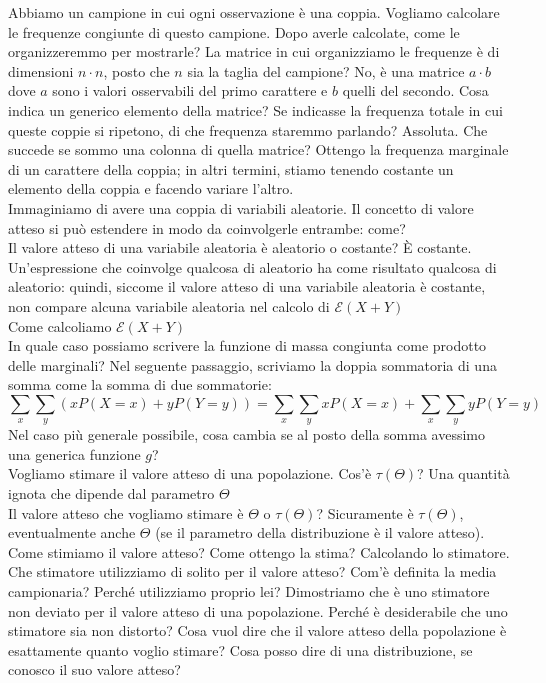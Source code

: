 \documentclass{article}
\begin{document}
    Abbiamo un campione in cui ogni osservazione è una coppia. Vogliamo calcolare le frequenze congiunte di questo campione. Dopo averle calcolate, come le organizzeremmo per
    mostrarle? La matrice in cui organizziamo le frequenze è di dimensioni $ n \cdot n $, posto che $ n $ sia la taglia del campione? No, è una matrice $ a \cdot b $ dove $ a $ sono i
    valori osservabili del primo carattere e $ b $ quelli del secondo. Cosa indica un generico elemento della matrice? Se indicasse la frequenza totale in cui queste coppie si ripetono,
    di che frequenza staremmo parlando? Assoluta. Che succede se sommo una colonna di quella matrice? Ottengo la frequenza marginale di un carattere della coppia; in altri 
    termini, stiamo tenendo costante un elemento della coppia e facendo variare l'altro. \\
    Immaginiamo di avere una coppia di variabili aleatorie. Il concetto di valore atteso si può estendere in modo da coinvolgerle entrambe: come? \\
    Il valore atteso di una variabile aleatoria è aleatorio o costante? È costante. Un'espressione che coinvolge qualcosa di aleatorio ha come risultato qualcosa di aleatorio:
    quindi, siccome il valore atteso di una variabile aleatoria è costante, non compare alcuna variabile aleatoria nel calcolo di $ \mathcal E ( X + Y ) $ \\
    Come calcoliamo $ \mathcal E ( X + Y ) $ \\
    In quale caso possiamo scrivere la funzione di massa congiunta come prodotto delle marginali?
    Nel seguente passaggio, scriviamo la doppia sommatoria di una somma come la somma di due sommatorie:
    \[
        \sum_{ x } \sum_{ y } ( x P ( X = x ) + y P ( Y = y )) = \sum_{ x } \sum_{ y } x P ( X = x ) + \sum_{ x } \sum_{ y } y P ( Y = y )
    \]
    Nel caso più generale possibile, cosa cambia se al posto della somma avessimo una generica funzione $ g $? \\
    Vogliamo stimare il valore atteso di una popolazione. Cos'è $ \tau (\Theta) $? Una quantità ignota che dipende dal parametro $ \Theta $ \\
    Il valore atteso che vogliamo stimare è $ \Theta $ o $ \tau (\Theta) $? Sicuramente è $ \tau (\Theta) $, eventualmente anche $ \Theta $ (se il parametro della distribuzione è
    il valore atteso). Come stimiamo il valore atteso? Come ottengo la stima? Calcolando lo stimatore. Che stimatore utilizziamo di solito per il valore atteso? Com'è definita la
    media campionaria? Perché utilizziamo proprio lei? Dimostriamo che è uno stimatore non deviato per il valore atteso di una popolazione. Perché è desiderabile che uno stimatore
    sia non distorto? Cosa vuol dire che il valore atteso della popolazione è esattamente quanto voglio stimare? Cosa posso dire di una distribuzione, se conosco il suo valore
    atteso?
    
\end{document}
